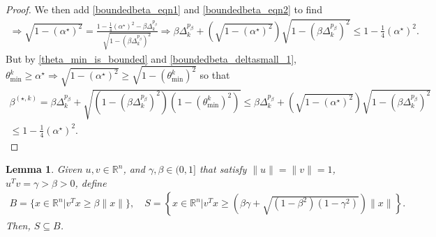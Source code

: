 \documentclass{article}
\newtheorem{lemma}[theorem]{Lemma}
\theoremstyle{case}
\newcommand{\bsk}{{\beta^{(\star, k)}}}
\newcommand{\dk}{\Delta_k}
\newcommand{\minanglealpha}{{ \alpha^{\star} }}
\newcommand{\Rn}{\mathbb R^n}
\newcommand{\thetamink}{{\theta^k_{\text{min}}}}
\begin{document}
\begin{proof}
We then add \cref{boundedbeta_eqn1} and \cref{boundedbeta_eqn2} to find
\begin{align*}
\Longrightarrow \sqrt{1 - \left(\minanglealpha\right)^2} = \frac{1 -  \frac 1 4 \left(\minanglealpha\right)^2 - \beta\dk^{p_{\beta}}}{\sqrt{1 - \left(\beta\dk^{p_{\beta}}\right)^2}}
\Longrightarrow \beta\dk^{p_{\beta}} + \left(\sqrt{1 - \left(\minanglealpha\right)^2}\right)\sqrt{1 - \left(\beta\dk^{p_{\beta}}\right)^2} \le 1 -  \frac 1 4 \left(\minanglealpha\right)^2.
\end{align*}
But by \cref{theta_min_is_bounded} and \cref{boundedbeta_deltasmall_1}, 
$\thetamink \ge \minanglealpha \Longrightarrow \sqrt{1 - \left(\minanglealpha\right)^2} \ge \sqrt{1 - \left(\thetamink\right)^2}$
so that
\begin{align*}
\bsk 
= \beta\dk^{p_{\beta}} + \sqrt{\left(1 - \left(\beta\dk^{p_{\beta}}\right)^2\right)\left(1 - \left(\thetamink\right)^2\right)} 
\le \beta\dk^{p_{\beta}} + \left(\sqrt{1 - \left(\minanglealpha\right)^2}\right)\sqrt{1 - \left(\beta\dk^{p_{\beta}}\right)^2} \\
\le 1 -  \frac 1 4 \left(\minanglealpha\right)^2.
\end{align*}
\end{proof}


\begin{lemma}
\label{cone_subset_cone}
Given $u, v \in \Rn$, and $\gamma, \beta \in (0, 1]$ that satisfy $\|u\| = \|v\|= 1$, $u^Tv = \gamma > \beta > 0$, define
\begin{align*}
B = \{x\in\Rn | {v}^Tx \ge \beta\|x\|\}, \quad
S = \left\{x\in\Rn \bigg| v^Tx \ge \left(\beta\gamma + \sqrt{(1 - \beta^2)\left(1 - \gamma^2\right)}\right)\|x\| \right\}. 
\end{align*}
Then, $S \subseteq B$.
\end{lemma}
\end{document}

